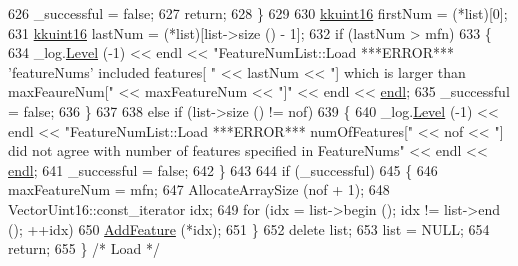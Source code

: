 \begin{DoxyCode}
626     \_successful = \textcolor{keyword}{false};
627     \textcolor{keywordflow}{return};
628   \}
629 
630   \hyperlink{namespace_k_k_b_aa8c7d4d30381c8a0b6fce68974a9c8a9}{kkuint16}  firstNum = (*list)[0];
631   \hyperlink{namespace_k_k_b_aa8c7d4d30381c8a0b6fce68974a9c8a9}{kkuint16}  lastNum  = (*list)[list->size () - 1];
632   \textcolor{keywordflow}{if}  (lastNum > mfn)
633   \{
634     \_log.\hyperlink{class_k_k_b_1_1_run_log_a32cf761d7f2e747465fd80533fdbb659}{Level} (-1) << endl << \textcolor{stringliteral}{"FeatureNumList::Load   ***ERROR***   'featureNums'  included features[
      "} << lastNum << \textcolor{stringliteral}{"]  which is larger than maxFeaureNum["} << maxFeatureNum << \textcolor{stringliteral}{"]"} << endl << 
      \hyperlink{namespace_k_k_b_ad1f50f65af6adc8fa9e6f62d007818a8}{endl};
635     \_successful = \textcolor{keyword}{false};
636   \}
637 
638   \textcolor{keywordflow}{else} \textcolor{keywordflow}{if}  (list->size () != nof)
639   \{
640     \_log.\hyperlink{class_k_k_b_1_1_run_log_a32cf761d7f2e747465fd80533fdbb659}{Level} (-1) << endl << \textcolor{stringliteral}{"FeatureNumList::Load   ***ERROR***   numOfFeatures["} << nof << \textcolor{stringliteral}{"] did
       not agree with number of features specified in FeatureNums"} << endl << \hyperlink{namespace_k_k_b_ad1f50f65af6adc8fa9e6f62d007818a8}{endl};
641     \_successful = \textcolor{keyword}{false};
642   \}
643 
644   \textcolor{keywordflow}{if}  (\_successful)
645   \{
646     maxFeatureNum = mfn;
647     AllocateArraySize (nof + 1);
648     VectorUint16::const\_iterator  idx;
649     \textcolor{keywordflow}{for}  (idx = list->begin ();  idx != list->end ();  ++idx)
650       \hyperlink{class_k_k_m_l_l_1_1_feature_num_list_a1d3b119854c90e602cab62ca46cd05cc}{AddFeature} (*idx);
651   \}
652   \textcolor{keyword}{delete}  list;
653   list = NULL;
654   \textcolor{keywordflow}{return};
655 \}  \textcolor{comment}{/* Load */}
\end{DoxyCode}
